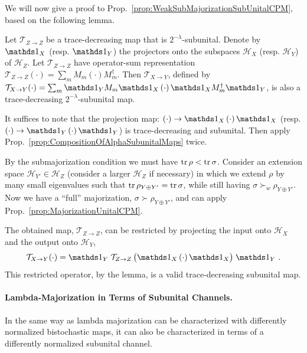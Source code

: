 \documentclass[11pt,a4paper]{article}
\def\Hs{\mathscr{H}}%
\newenvironment{myproof}[1][\proofname]{%
  \color{prooftextcolor} \footnotesize \proof[\itshape #1]\hspace*{1.2mm}%
}{\endproof}
\begin{document}
We will now give a proof to Prop.~\ref{prop:WeakSubMajorizationSubUnitalCPM}, based on the following lemma.
\begin{lemma}
  \label{lemma:AlphaSubUnitalCompWithProj}
  Let $\mathcal{T}_{Z\rightarrow Z}$ be a trace-decreasing map that is $2^{-\lambda}$-subunital. Denote by
  $\Ident_X$ (resp. $\Ident_Y$) the projectors onto the subspaces $\Hs_X$ (resp. $\Hs_Y$) of $\Hs_Z$. Let
  $\mathcal{T}_{Z\rightarrow Z}$ have operator-sum representation
  $\mathcal{T}_{Z\rightarrow Z}(\cdot) = \sum_m M_m\left(\cdot\right)M_m^\dagger$. Then
  $\mathcal{T}_{X\rightarrow Y}$, defined by
  $\mathcal{T}_{X\rightarrow Y}(\cdot) = \sum_m \Ident_Y M_m\Ident_X \left(\cdot\right) \Ident_X M_m^\dagger\Ident_Y$,
  is also a trace-decreasing $2^{-\lambda}$-subunital map.
\end{lemma}
\begin{myproof}[Proof of Lemma~\ref{lemma:AlphaSubUnitalCompWithProj}]
  It suffices to note that the projection map: $\left(\cdot\right) \rightarrow \Ident_X \left(\cdot\right) \Ident_X$
  (resp. $\left(\cdot\right) \rightarrow \Ident_Y \left(\cdot\right) \Ident_Y$) is trace-decreasing and subunital.
  Then apply Prop.~\ref{prop:CompositionOfAlphaSubunitalMaps} twice.
\end{myproof}

\begin{myproof}[Proof of Prop.~\ref{prop:WeakSubMajorizationSubUnitalCPM}]
  By the submajorization condition we must have $\operatorname{tr}\rho < \operatorname{tr}\sigma$. Consider an extension space
  $\Hs_{Y'}\in\Hs_Z$ (consider a larger $\Hs_Z$ if necessary) in which we extend $\rho$ by many small
  eigenvalues such that $\operatorname{tr} \rho_{Y\oplus Y'} = \operatorname{tr}\sigma$, while still having $\sigma \succ_w \rho_{Y\oplus Y'}$.
  Now we have a ``full'' majorization, $\sigma\succ\rho_{Y\oplus Y'}$, and can apply
  Prop.~\ref{prop:MajorizationUnitalCPM}.

  The obtained map, $\mathcal{T}_{Z\rightarrow Z}$, can be restricted by projecting the input onto $\Hs_X$
  and the output onto $\Hs_Y$,
  \begin{align*}
    \mathcal{T}_{X\rightarrow Y}(\cdot)
    = \Ident_Y\; \mathcal{T}_{Z\rightarrow Z}\,\bigl(\Ident_X \left(\cdot\right) \Ident_X \bigr)\; \Ident_Y\ .
  \end{align*}
  This restricted operator, by the lemma, is a valid trace-decreasing subunital map.
\end{myproof}

\paragraph{Lambda-Majorization in Terms of Subunital Channels.}
In the same way as lambda majorization can be characterized with differently normalized bistochastic maps,
it can also be characterized in terms of a differently normalized subunital channel.
\end{document}
